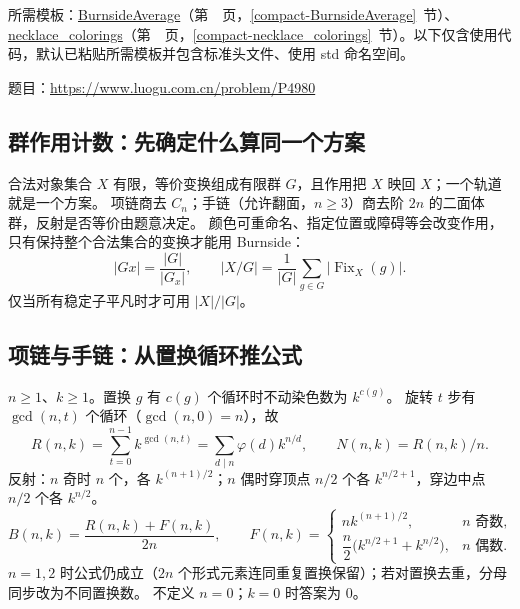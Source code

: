 所需模板：\hyperref[compact-BurnsideAverage]{BurnsideAverage}（第~\pageref{compact-BurnsideAverage}~页，\ref{compact-BurnsideAverage}~节）、\hyperref[compact-necklace_colorings]{necklace\_\allowbreak{}colorings}（第~\pageref{compact-necklace_colorings}~页，\ref{compact-necklace_colorings}~节）。以下仅含使用代码，默认已粘贴所需模板并包含标准头文件、使用 std 命名空间。

题目：\url{https://www.luogu.com.cn/problem/P4980}



\subsection{群作用计数：先确定什么算同一个方案}\label{knowledge-orbits-model}
合法对象集合 $X$ 有限，等价变换组成有限群 $G$，且作用把 $X$ 映回 $X$；一个轨道就是一个方案。
项链商去 $C_n$；手链（允许翻面，$n\ge3$）商去阶 $2n$ 的二面体群，反射是否等价由题意决定。
颜色可重命名、指定位置或障碍等会改变作用，只有保持整个合法集合的变换才能用 Burnside：
\[
|Gx|=\frac{|G|}{|G_x|},\qquad
|X/G|=\frac1{|G|}\sum_{g\in G}|\operatorname{Fix}_X(g)|.
\]
仅当所有稳定子平凡时才可用 $|X|/|G|$。



\subsection{项链与手链：从置换循环推公式}\label{knowledge-orbits-dihedral}
$n\ge1$、$k\ge1$。置换 $g$ 有 $c(g)$ 个循环时不动染色数为 $k^{c(g)}$。
旋转 $t$ 步有 $\gcd(n,t)$ 个循环（$\gcd(n,0)=n$），故
\[
R(n,k)=\sum_{t=0}^{n-1}k^{\gcd(n,t)}
      =\sum_{d\mid n}\varphi(d)k^{n/d},\qquad N(n,k)=R(n,k)/n.
\]
反射：$n$ 奇时 $n$ 个，各 $k^{(n+1)/2}$；$n$ 偶时穿顶点 $n/2$ 个各 $k^{n/2+1}$，穿边中点 $n/2$ 个各 $k^{n/2}$。
\[
B(n,k)=\frac{R(n,k)+F(n,k)}{2n},\qquad
F(n,k)=\begin{cases}
nk^{(n+1)/2},&n\text{ 奇数},\\
\dfrac n2\bigl(k^{n/2+1}+k^{n/2}\bigr),&n\text{ 偶数}.
\end{cases}
\]
$n=1,2$ 时公式仍成立（$2n$ 个形式元素连同重复置换保留）；若对置换去重，分母同步改为不同置换数。
不定义 $n=0$；$k=0$ 时答案为 0。



